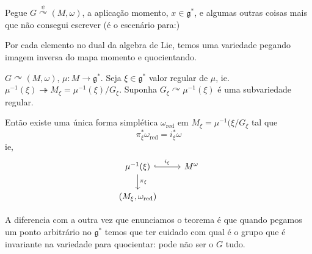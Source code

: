 Pegue $G\overset{\psi}{\curvearrowright}(M,\omega)$, a aplicação momento, $x\in\mathfrak{g}^*$, e algumas outras coisas mais que não consegui escrever (é o escenário para:)

\begin{thm}\leavevmode
{\color{4}Por cada elemento no dual da algebra de Lie, temos uma variedade pegando imagem inversa do mapa momento e quocientando.}

	$G\curvearrowright(M,\omega)$, $\mu:M\longrightarrow \mathfrak{g}^*$. Seja $\xi\in\mathfrak{g}^*$ valor regular de $\mu$, ie. $\mu^{-1}(\xi)\twoheadrightarrow M_\xi=\mu^{-1}(\xi)/G_\xi$. Suponha $G_\xi\curvearrowright \mu^{-1}(\xi)$ é uma subvariedade regular.

Então existe uma única forma simplética $\omega_{\operatorname{red}}$ em $M_\xi=\mu^{-1}(\xi/G_\xi$ tal que
\[\pi^* _\xi\omega_{\operatorname{red}}=i^*_\xi\omega\]
ie,
\[\begin{tikzcd}
	\mu^{-1}(\xi)\arrow[r,hook,"i_\xi"]\arrow[d,"\pi_\xi"]& M^\omega\\
	(M_\xi,\omega_{\operatorname{red}})
\end{tikzcd}\]
\end{thm}

\begin{remark}\leavevmode
	A diferencia com a outra vez que enunciamos o teorema é que quando pegamos um ponto arbitrário no $\mathfrak{g}^*$ temos que ter cuidado com qual é o grupo que é invariante na variedade para quocientar: pode não ser o $G$ tudo.
\end{remark}

